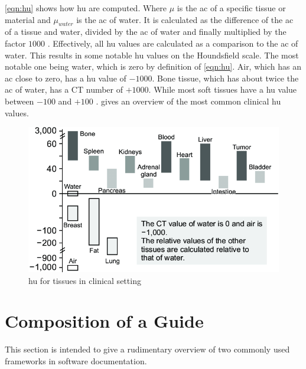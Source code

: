 \noindent
\cref{eqn:hu} shows how \acrshort{hu} are computed.
Where $\mu$ is the \acrlong{ac} of a specific tissue or material and $\mu_{water}$
is the \acrlong{ac} of water.
It is calculated as the difference of the \acrlong{ac} of a tissue and water,
divided by the \acrshort{ac} of water and finally multiplied by the factor $1000$ \cite{liMicrocomputedTomographySmall2008}.
Effectively, all \acrshort{hu} values are calculated as a comparison to the \acrlong{ac} of water.
This results in some notable \acrshort{hu} values on the Houndsfield scale.
The most notable one being water, which is zero by definition of \cref{eqn:hu}.
Air, which has an \acrlong{ac} close to zero, has a \acrshort{hu} value of $-1000$.
Bone tissue, which has about twice the \acrlong{ac} of water, has a CT number of $+1000$.
While most soft tissues have a \acrshort{hu} value between $-100$ and $+100$ \cite{liMicrocomputedTomographySmall2008}.
 gives an overview of the most common clinical \acrshort{hu} values.
\begin{figure}[h]
	\centerline{
		\includegraphics[scale=0.5]{images/huScale.png}}
	\caption{\acrshort{hu} for tissues in clinical setting \cite{jungBasicPhysicalPrinciples2021}}\label{fig:hu-scale}
\end{figure}


\pagebreak
\section{Composition of a Guide}\label{s:guide-creation}
This section is intended to give a rudimentary overview of two commonly used frameworks in software documentation.



